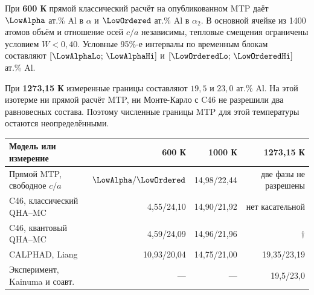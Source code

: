 \thispagestyle{plain}
\vspace{3mm}
\vspace{1.5mm}
\vspace{2mm}\noindent{\color{teal}\rule{\linewidth}{1pt}}\par

\noindent При \textbf{600 К} прямой классический расчёт на опубликованном MTP
даёт \(\boldsymbol{\LowAlpha}\) ат.\% Al в \(\alpha\) и
\(\boldsymbol{\LowOrdered}\) ат.\% Al в \(\alpha_2\). В основной
ячейке из 1400 атомов объём и отношение осей \(c/a\) независимы,
тепловые смещения ограничены условием \(W<0{,}40\). Условные 95\%-е
интервалы по временным блокам составляют
\([\LowAlphaLo;\,\LowAlphaHi]\) и \([\LowOrderedLo;\,\LowOrderedHi]\) ат.\% Al.

При \textbf{1273,15 К} измеренные границы составляют \(19{,}5\) и
\(23{,}0\) ат.\% Al. На этой изотерме ни прямой расчёт MTP, ни
Монте-Карло с C46 не разрешили два равновесных состава. Поэтому
численные границы MTP для этой температуры остаются неопределёнными.

\begin{center}\small
\begin{tabular}{@{}lrrr@{}}
\toprule
Модель или измерение & 600 К & 1000 К & 1273,15 К\\
\midrule
Прямой MTP, свободное \(c/a\) & \(\LowAlpha/\LowOrdered\) & 14,98/22,44 & две фазы не разрешены\\
C46, классический QHA--MC    & 4,55/24,10 & 14,90/21,92 & нет касательной\\
C46, квантовый QHA--MC       & 4,59/24,09 & 14,96/21,96 & \(\dagger\)\\
CALPHAD, Liang                & 10,93/20,04 & 14,75/21,00 & 19,35/23,19\\
Эксперимент, Kainuma и соавт. & --- & --- & 19,5/23,0\\
\bottomrule
\end{tabular}
\end{center}
